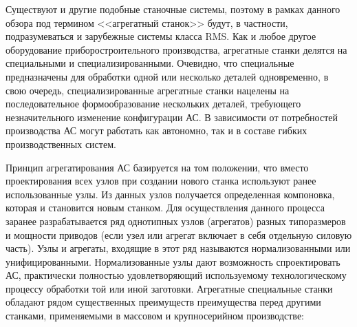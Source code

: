 Существуют и другие подобные станочные системы, поэтому в рамках данного обзора под термином <<агрегатный станок>> будут, в частности, подразумеваться и зарубежные системы класса RMS. Как и любое другое оборудование приборостроительного производства, агрегатные станки делятся на специальными и специализированными. Очевидно, что специальные предназначены для обработки одной или несколько деталей одновременно, в свою очередь, специализированные агрегатные станки нацелены на последовательное формообразование нескольких деталей, требующего незначительного изменение конфигурации АС. В зависимости от потребностей производства АС могут работать как автономно, так и в составе гибких производственных систем.

Принцип агрегатирования АС базируется на том положении, что вместо проектирования всех узлов при создании нового станка используют ранее использованные узлы. Из данных узлов получается определенная компоновка, которая и становится новым станком. Для осуществления данного процесса заранее разрабатывается ряд однотипных узлов (агрегатов) разных типоразмеров и мощности приводов (если узел или агрегат включает в себя отдельную силовую часть). Узлы и агрегаты, входящие в этот ряд называются нормализованными или унифицированными. Нормализованные узлы дают возможность спроектировать АС, практически полностью удовлетворяющий используемому технологическому процессу обработки той или иной заготовки. Агрегатные специальные станки обладают рядом существенных преимуществ преимущества перед другими станками, применяемыми в массовом и крупносерийном производстве:

